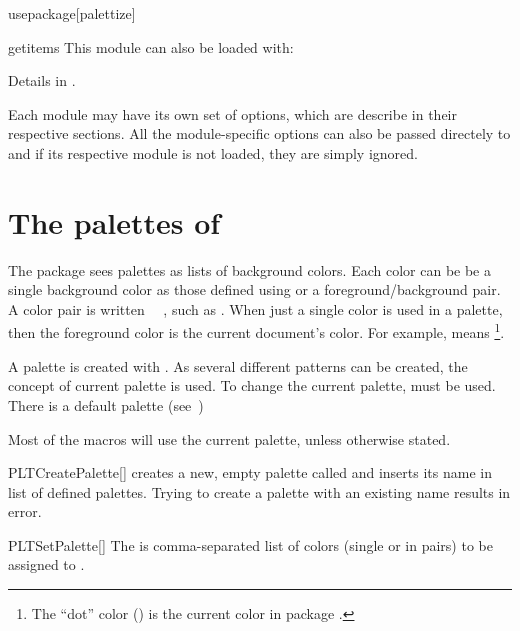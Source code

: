 \documentclass[a4paper, 11pt]{article}
\begin{document}
\begin{macro*}{usepackage}{}[palettize]
\begin{option}{getitems}{}
        This module can also be loaded with:
        \begin{latexcode}
            \usepackage{palettize-getitems}
        \end{latexcode}

        Details in .
    \end{option}

    Each module may have its own set of options, which are describe in their respective sections. All the module-specific options can also be passed directely to  and if its respective module is not loaded, they are simply ignored.
\end{macro*}


\section{The palettes of }\label{sec:palettes}

The package  sees palettes as lists of background colors. Each color can be be a single background color as those defined using  or a foreground/background pair. A color pair is written ~~, such as . When just a single color is used in a palette, then the foreground color is the current document's color. For example,  means \footnote{The ``dot'' color () is the current color in package .}.

A palette is created with . As several different patterns can be created, the concept of current palette is used. To change the current palette,  must be used. There is a default palette (see~)

Most of the macros will use the current palette, unless otherwise stated.

\begin{macro}{PLTCreatePalette}[]
     creates a new, empty palette called  and inserts its name in list of defined palettes. Trying to create a palette with an existing name results in error.
\end{macro}

\begin{macro}{PLTSetPalette}[]
    The  is comma-separated list of colors (single or in pairs) to be assigned to .
\end{macro}
\end{document}
